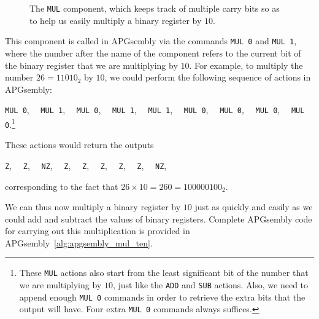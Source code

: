 \begin{figure}[!htb]
	\centering
	\caption{The \texttt{MUL} component, which keeps track of multiple carry bits so as to help us easily multiply a binary register by $10$.}\label{fig:mul_component}
\end{figure}

This component is called in APGsembly via the commands \texttt{MUL 0} and \texttt{MUL 1}, where the number after the name of the component refers to the current bit of the binary register that we are multiplying by $10$. For example, to multiply the number $26 = 11010_2$ by $10$, we could perform the following sequence of actions in APGsembly:
\begin{center}
	\texttt{MUL 0}, \ \ \texttt{MUL 1}, \ \ \texttt{MUL 0}, \ \ \texttt{MUL 1}, \ \ \texttt{MUL 1}, \ \ \texttt{MUL 0}, \ \ \texttt{MUL 0}, \ \ \texttt{MUL 0}, \ \ \texttt{MUL 0}.\footnote{These \texttt{MUL} actions also start from the least significant bit of the number that we are multiplying by $10$, just like the \texttt{ADD} and \texttt{SUB} actions. Also, we need to append enough \texttt{MUL 0} commands in order to retrieve the extra bits that the output will have. Four extra \texttt{MUL 0} commands always suffices.}
\end{center}
These actions would return the outputs
\begin{center}
	\leavevmode{}\texttt{Z}, \ \ \texttt{Z}, \ \ \texttt{NZ}, \ \ \texttt{Z}, \ \ \texttt{Z}, \ \ \texttt{Z}, \ \ \texttt{Z}, \ \ \texttt{Z}, \ \ \texttt{NZ},
\end{center}
corresponding to the fact that $26 \times 10 = 260 = 100000100_2$.


We can thus now multiply a binary register by $10$ just as quickly and easily as we could add and subtract the values of binary registers. Complete APGsembly code for carrying out this multiplication is provided in APGsembly~\ref{alg:apgsembly_mul_ten}.

